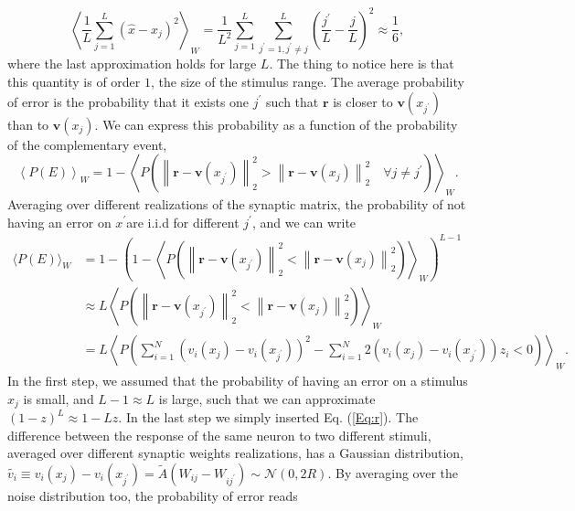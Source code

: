 \documentclass[a4paper]{article}%
\begin{document}
\begin{equation}
\left\langle \frac{1}{L}\sum_{j=1}^{L} (\hat{x}-x_{j})^{2}\right\rangle _{W}
=\frac{1}{L^{2}}\sum_{j=1}^{L} \sum_{j^{\prime}=1,j^{\prime}\neq j}^{L}
\left(  \frac{j^{\prime}} {L}-\frac{j}{L}\right)  ^{2} \approx\frac{1}{6},
\end{equation}
where the last approximation holds for large $L$. The thing to notice here is
that this quantity is of order $1$, the size of the stimulus range. The
average probability of error is the probability that it exists one $j^{\prime
}$ such that $\mathbf{r}$ is closer to $\mathbf{v}(x_{j^{\prime}})$ than to
$\mathbf{v}(x_{j})$. We can express this probability as a function of the
probability of the complementary event,
\begin{equation}
\left\langle P(E)\right\rangle _{W} = 1 - \left\langle P\left(  \left\|
\mathbf{r}-\mathbf{v}(x_{j^{\prime}})\right\|  _{2}^{2} >\left\|  \mathbf{r}
-\mathbf{v}(x_{j})\right\|  _{2}^{2} \quad\forall j \neq j^{\prime}\right)
\right\rangle _{W}.
\end{equation}
Averaging over different realizations of the synaptic matrix, the probability
of not having an error on $x^{\prime}$are i.i.d for different $j^{\prime}$,
and we can write
\begin{equation}
\begin{split}
\langle P(E)\rangle_{W}  &  = 1 - \left(  1 - \left\langle P\left(  \left\|
\mathbf{r}-\mathbf{v}(x_{j^{\prime}})\right\|  _{2}^{2} < \left\|  \mathbf{r}
-\mathbf{v}(x_{j})\right\|  _{2}^{2} \right)  \right\rangle _{W}\right)
^{L-1}\\
&  \approx L \left\langle P\left(  \left\|  \mathbf{r}-\mathbf{v}%
(x_{j^{\prime}})\right\|  _{2}^{2} < \left\|  \mathbf{r} -\mathbf{v}%
(x_{j})\right\|  _{2}^{2} \right)  \right\rangle _{W}\\
&  = L \left\langle P\left(  \sum_{i=1}^{N} \left(  v_{i} (x_j)- v_{i}%
(x_{j^{\prime}})\right)  ^{2} - \sum_{i=1}^{N}2\left(  v_{i}(x_j)-v_{i}(x_{j^{\prime}
})\right)  z_{i} < 0 \right)  \right\rangle _{W}.
\end{split}
\end{equation}
In the first step, we assumed that the
probability of having an error on a stimulus $x_{j}$ is small, and $L-1
\approx L$ is large, such that we can approximate $(1-z)^{L} \approx1 -Lz$. In
the last step we simply inserted Eq. (\ref{Eq:r}). The difference between
the response of the same neuron to two different stimuli, averaged over
different synaptic weights realizations, has a Gaussian distribution,
$\tilde{v_{i}} \equiv v_{i}(x_{j})-v_{i}(x_{j^{\prime}}) = \tilde{A}(W_{ij}
-W_{ij^{\prime}}) \sim\mathcal{N}(0,2R)$. By averaging over the noise
distribution too, the probability of error reads
\end{document}
